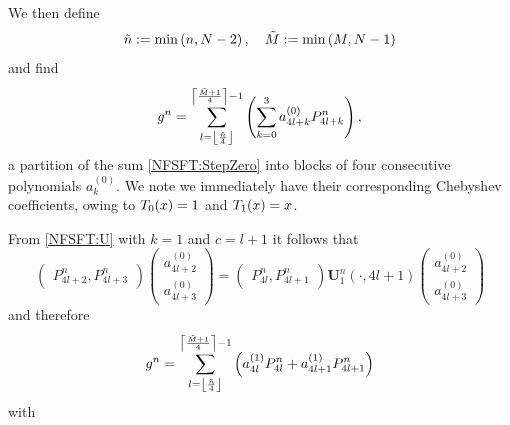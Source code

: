 We then define 
\[
\tilde{n} := \min{\hspace{-0.4ex}}\left(n,N-2\right), \quad \tilde{M} := \min{\hspace{-0.4ex}}\left(M,N-1\right)
\]
and find
\[
  g^n = \sum_{l = \left\lfloor\frac{\tilde{n}}{4}\right\rfloor}^{\left\lceil\frac{\tilde{M}+1}{4}\right\rceil-1} \left(\sum_{k=0}^{3} a_{4l+k}^{(0)} P_{4l+k}^{n}\right),
\]
a partition of the sum \eqref{NFSFT:StepZero} into blocks of four consecutive polynomials $a_{k}^{(0)}$.
We note we immediately have their corresponding Chebyshev coefficients, owing to $T_{0}{\hspace{-0.4ex}}\left(x\right) = 1$ and
$T_{1}{\hspace{-0.4ex}}\left(x\right)=x$.

From \eqref{NFSFT:U} with $k = 1$ and $c = l+1$ it follows that
\[
\left(\begin{array}{c}
  P_{4l+2}^{n}, 
  P_{4l+3}^{n}
\end{array}\right)
\left(\begin{array}{c}
  a_{4l+2}^{(0)}\\
  a_{4l+3}^{(0)} 
\end{array}\right)
=
\left(\begin{array}{c}
  P_{4l}^{n},
  P_{4l+1}^{n}
\end{array}\right)
{\mathbf{U}_{1}^{n}\left(\cdot,4l+1\right)}
\left(\begin{array}{c}
  a_{4l+2}^{(0)}\\
  a_{4l+3}^{(0)} 
\end{array}\right)
\]
and therefore
\[ 
  g^n = \sum_{l = \left\lfloor\frac{\tilde{n}}{4}\right\rfloor}^{\left\lceil\frac{\tilde{M}+1}{4}\right\rceil-1} 
  \left(a_{4l}^{(1)} P_{4l}^{n} + a_{4l+1}^{(1)} P_{4l+1}^{n}\right) 
\]
with
